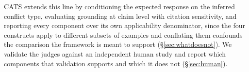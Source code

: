 \documentclass[11pt]{article}
\begin{document}
CATS extends this line by conditioning the expected response on the inferred
conflict type, evaluating grounding at claim level with citation sensitivity, and
reporting every component over its own applicability denominator, since the four
constructs apply to different subsets of examples and conflating them confounds
the comparison the framework is meant to support (\S\ref{sec:whatdoesnot}). We
validate the judges against an independent human study \citep{zheng2023judging}
and report which components that validation supports and which it does not
(\S\ref{sec:human}).







\end{document}
